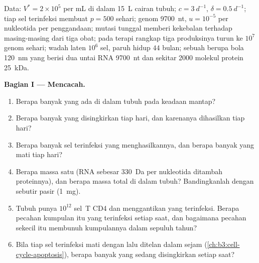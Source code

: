 \begin{problem}
\label{pb:b3:virology:1}
Data:  $V^{*} = 2\times 10^{5}$ per mL di dalam \qty{15}{L} cairan
tubuh; $c = \qty{3}{d^{-1}}$, $\delta = \qty{0.5}{d^{-1}}$; tiap sel terinfeksi
membuat $p = 500$  sehari; genom \qty{9700}{nt}, $u = 10^{-5}$
per nukleotida per penggandaan; mutasi tunggal memberi kekebalan terhadap
masing-masing dari tiga obat; pada terapi rangkap tiga produksinya turun ke
$10^{7}$ genom sehari; wadah laten $10^{6}$ sel, paruh hidup $44$ bulan;
sebuah  berupa bola \qty{120}{nm} yang berisi dua untai RNA \qty{9700}{nt}
dan sekitar \num{2000} molekul protein \qty{25}{kDa}.

\medskip
\noindent\textbf{Bagian I --- Mencacah.}
\begin{enumerate}
  \item Berapa banyak  yang ada di dalam tubuh pada keadaan mantap?
  \item Berapa banyak yang disingkirkan tiap hari, dan karenanya dihasilkan
        tiap hari?
  \item Berapa banyak sel terinfeksi yang menghasilkannya, dan berapa banyak
        yang mati tiap hari?
  \item Berapa massa satu  (RNA sebesar \qty{330}{Da} per
        nukleotida ditambah proteinnya), dan berapa massa total  di dalam
        tubuh? Bandingkanlah dengan sebutir pasir (\qty{1}{mg}).
  \item Tubuh punya $10^{12}$ sel~T CD4 dan menggantikan yang
        terinfeksi. Berapa pecahan kumpulan itu yang terinfeksi setiap saat,
        dan bagaimana pecahan sekecil itu membunuh kumpulannya dalam sepuluh
        tahun?
  \item Bila tiap sel terinfeksi mati dengan  lalu ditelan dalam
        sejam (\cref{ch:b3:cell-cycle-apoptosis}), berapa banyak yang sedang
        disingkirkan setiap saat?
\end{enumerate}


\end{problem}
